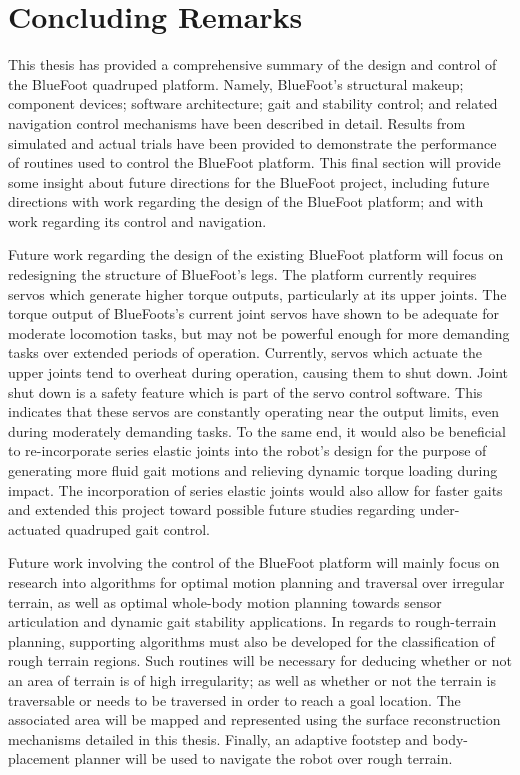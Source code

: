 \chapter{Concluding Remarks}
	\label{ch::conclusion}

	This thesis has provided a comprehensive summary of the design and control of the BlueFoot quadruped platform. Namely, BlueFoot's structural makeup; component devices; software architecture; gait and stability control; and related navigation control mechanisms have been described in detail. Results from simulated and actual trials have been provided to demonstrate the performance of routines used to control the BlueFoot platform. This final section will provide some insight about future directions for the BlueFoot project, including future directions with work regarding the design of the BlueFoot platform; and with work regarding its control and navigation.


	Future work regarding the design of the existing BlueFoot platform will focus on redesigning the structure of BlueFoot's legs. The platform currently requires servos which generate higher torque outputs, particularly at its upper joints. The torque output of BlueFoots's current joint servos have shown to be adequate for moderate locomotion tasks, but may not be powerful enough for more demanding tasks over extended periods of operation. Currently, servos which actuate the upper joints tend to overheat during operation, causing them to shut down. Joint shut down is a safety feature which is part of the servo control software. This indicates that these servos are constantly operating near the output limits, even during moderately demanding tasks. To the same end, it would also be beneficial to re-incorporate series elastic joints into the robot's design for the purpose of generating more fluid gait motions and relieving dynamic torque loading during impact. The incorporation of series elastic joints would also allow for faster gaits and extended this project toward possible future studies regarding under-actuated quadruped gait control.


	Future work involving the control of the BlueFoot platform will mainly focus on research into algorithms for optimal motion planning and traversal over irregular terrain, as well as optimal whole-body motion planning towards sensor articulation and dynamic gait stability applications. In regards to rough-terrain planning, supporting algorithms must also be developed for the classification of rough terrain regions. Such routines will be necessary for deducing whether or not an area of terrain is of high irregularity; as well as whether or not the terrain is traversable or needs to be traversed in order to reach a goal location. The associated area will be mapped and represented using the surface reconstruction mechanisms detailed in this thesis. Finally, an adaptive footstep and body-placement planner will be used to navigate the robot over rough terrain. 


